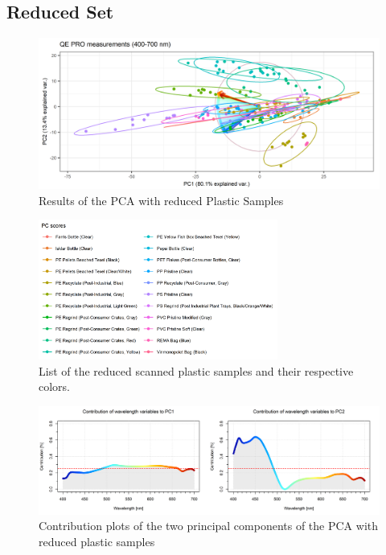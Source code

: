 \begin{appendices}
\section{Reduced Set}
\begin{figure}[H]
    \centering
    \includegraphics[width=1\textwidth]{Images/results/PCA_plastics_reduced_only_scat.png}
    \caption{Results of the PCA with reduced Plastic Samples}
    \label{fig:PCA_plastics_reduced_only_scat}
\end{figure}

\begin{figure}[H]
    \centering
    \includegraphics[width=0.7\textwidth]{Images/results/PCA_plastics_reduced_list.png}
    \caption{List of the reduced scanned plastic samples and their respective colors.}
    \label{fig:PCA_plastics_reduced_list}
\end{figure}

\begin{figure}[H]
    \centering
    \includegraphics[width=1\textwidth]{Images/results/PCA_plastics_reduced_doub_cont.png}
    \caption{Contribution plots of the two principal components of the PCA with reduced plastic samples}
    \label{fig:PCA_plastics_doub_cont}
\end{figure}


\end{appendices}
